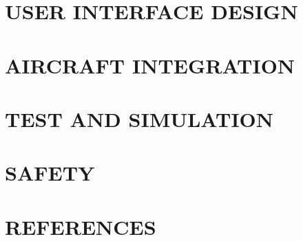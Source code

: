\documentclass[12pt]{article}
\begin{document}
\section{USER INTERFACE DESIGN}

\section{AIRCRAFT INTEGRATION}

\section{TEST AND SIMULATION}

\section{SAFETY}

\section{REFERENCES}

\singlespacing
 

\end{document}
